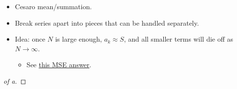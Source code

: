 \begin{solution}

\envlist

\begin{concept}

\envlist

\begin{itemize}
\tightlist
\item
  Cesaro mean/summation.
\item
  Break series apart into pieces that can be handled separately.
\item
  Idea: once \(N\) is large enough, \(a_k \approx S\), and all smaller
  terms will die off as \(N\to \infty\).

  \begin{itemize}
  \tightlist
  \item
    See
    \href{https://math.stackexchange.com/questions/514802/convergence-of-series-implies-convergence-of-cesaro-mean}{this
    MSE answer}.
  \end{itemize}
\end{itemize}

\end{concept}

\begin{proof}[of a]

\envlist


\end{proof}
\end{solution}
